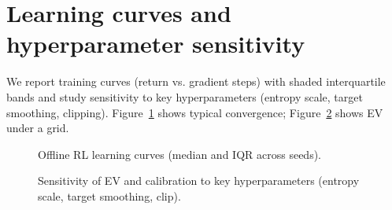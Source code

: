 \section{Learning curves and hyperparameter sensitivity}
We report training curves (return vs. gradient steps) with shaded interquartile bands and study sensitivity to key hyperparameters (entropy scale, target smoothing, clipping). Figure~\ref{fig:rl-curves} shows typical convergence; Figure~\ref{fig:hparam-sens} shows EV under a grid.
\begin{figure}[t]
  \centering
  \caption{Offline RL learning curves (median and IQR across seeds).}
  \label{fig:rl-curves}
\end{figure}

\begin{figure}[t]
  \centering
  \caption{Sensitivity of EV and calibration to key hyperparameters (entropy scale, target smoothing, clip).}
  \label{fig:hparam-sens}
\end{figure}

